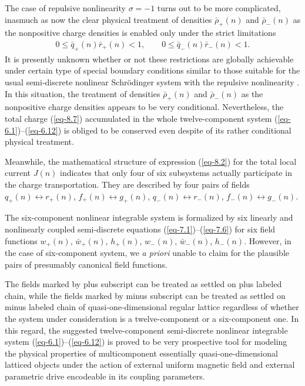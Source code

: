 \documentclass[10pt,a4paper]{amsart}
\numberwithin{equation}{section}
\begin{document}
The case of repulsive nonlinearity $\sigma=-1$ turns out to be more complicated, inasmuch as now the clear physical treatment of densities $\bar{\rho}_{+}(n)$ and $\bar{\rho}_{-}(n)$ as the nonpositive charge densities is enabled only under the strict limitations
\begin{gather*}%
	0 \leq \bar{q}_{+}(n)\bar{r}_{+}(n) < 1,
\qquad %
	0 \leq \bar{q}_{-}(n)\bar{r}_{-}(n) < 1 .
\end{gather*}
It is presently unknown whether or not these restrictions are globally achievable under certain type of special boundary conditions similar to those suitable for the usual semi-discrete nonlinear Schr\"{o}dinger system with the repulsive nonlinearity \cite{chubykalo-PLA-169-359, konotop-JPA-25-4037, vekslerchik-IP-8-889}. In this situation, the treatment of densities $\bar{\rho}_{+}(n)$ and $\bar{\rho}_{-}(n)$ as the nonpositive charge densities appears to be very conditional. Nevertheless, the total charge (\ref{eq-8.7})
accumulated in the whole twelve-component system \mbox{(\ref{eq-6.1})--(\ref{eq-6.12})} is obliged to be conserved even despite of its rather conditional physical treatment.

Meanwhile, the mathematical structure of expression (\ref{eq-8.2}) for the total local current $J(n)$ indicates that only four of six subsystems actually participate in the charge transportation. They are described by four pairs of fields $q_{+}(n)\leftrightarrow r_{+}(n)$, $f_{+}(n)\leftrightarrow g_{+}(n)$, $q_{-}(n)\leftrightarrow r_{-}(n)$, $f_{-}(n)\leftrightarrow g_{-}(n)$.

The six-component nonlinear integrable system is formalized by six linearly and nonlinearly coupled semi-discrete equations (\ref{eq-7.1})--(\ref{eq-7.6}) for six field functions $w_{+}(n)$, $\bar{w}_{+}(n)$, $h_{+}(n)$, $w_{-}(n)$, $\bar{w}_{-}(n)$, $h_{-}(n)$. However, in the case of six-component system, we \textit{a priori} unable to claim for the plausible pairs of presumably canonical field functions.

The fields marked by plus subscript can be treated as settled on plus labeled chain, while the fields marked by minus subscript can be treated as settled on minus labeled chain of quasi-one-dimensional regular lattice regardless of whether the system under consideration is a twelve-component or a six-component one. In this regard, the suggested twelve-component semi-discrete nonlinear integrable system (\ref{eq-6.1})--(\ref{eq-6.12}) is proved to be very prospective tool for modeling the physical properties of multicomponent essentially quasi-one-dimensional latticed objects under the action of external uniform magnetic field and external parametric drive encodeable in its coupling parameters.
\end{document}
